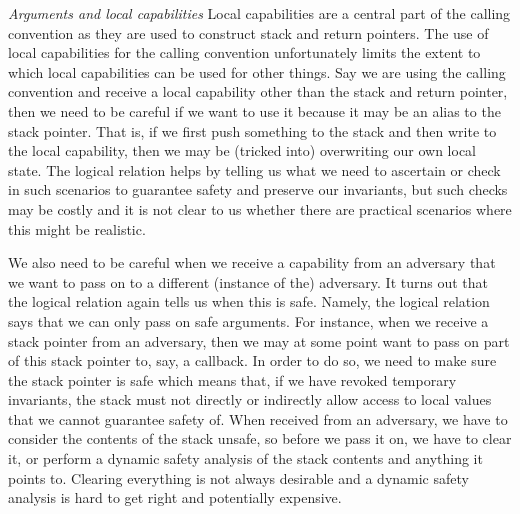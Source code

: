 \documentclass[format=acmsmall, review=false, screen=true]{acmart}
\begin{document}
\emph{Arguments and local capabilities} 
Local capabilities are a central part of the calling convention as they are used
to construct stack and return pointers. The use of local capabilities for the
calling convention unfortunately limits the extent to which local capabilities
can be used for other things. Say we are using the calling convention and
receive a local capability other than the stack and return pointer, then we need
to be careful if we want to use it because it may be an alias to the stack
pointer. That is, if we first push something to the stack and then write to the
local capability, then we may be (tricked into) overwriting our own local state.
The logical relation helps by telling us what we need to ascertain or check in
such scenarios to guarantee safety and preserve our invariants, but such checks
may be costly and it is not clear to us whether there are practical scenarios
where this might be realistic.

We also need to be careful when we receive a capability from an adversary that
we want to pass on to a different (instance of the) adversary. It turns out that
the logical relation again tells us when this is safe. Namely, the logical
relation says that we can only pass on safe arguments. For instance, when we
receive a stack pointer from an adversary, then we may at some point want to
pass on part of this stack pointer to, say, a callback. In order to do so, we
need to make sure the stack pointer is safe which means that, if we have revoked
temporary invariants, the stack must not directly or indirectly allow access to
local values that we cannot guarantee safety of. When received from an
adversary, we have to consider the contents of the stack unsafe, so before we
pass it on, we have to clear it, or perform a dynamic safety analysis of the
stack contents and anything it points to. Clearing everything is not always
desirable and a dynamic safety analysis is hard to get right and potentially
expensive.
\end{document}
